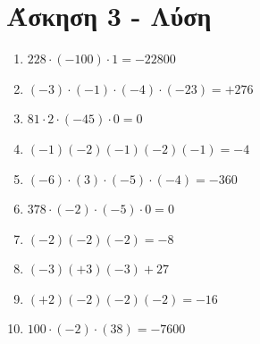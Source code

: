\documentclass[a4paper,10pt]{report}
\begin{document}

\section*{Άσκηση 3 - Λύση\hfill \small{}}
\begin{enumerate}[1)]
 \item $228\cdot(-100)\cdot 1=-22800$
 \item $(-3)\cdot(-1)\cdot(-4)\cdot(-23)=+276$
 \item $81\cdot2\cdot(-45)\cdot0=0$
 \item $(-1)(-2)(-1)(-2)(-1)=-4$
 \item $(-6)\cdot(3)\cdot(-5)\cdot(-4)=-360$
 \item $378\cdot(-2)\cdot(-5)\cdot0=0$
 \item $(-2)(-2)(-2)=-8$
 \item $(-3)(+3)(-3)+27$
 \item $(+2)(-2)(-2)(-2)=-16$
 \item $100\cdot(-2)\cdot(38)=-7600$
\end{enumerate}
\end{document}
